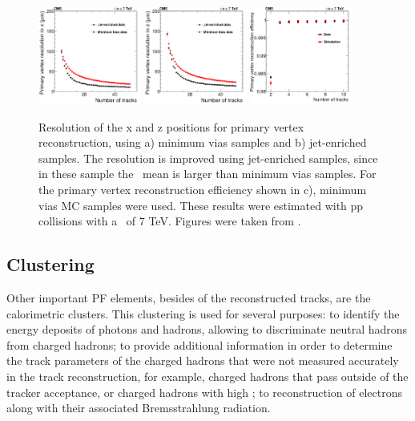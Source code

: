 \begin{figure}[ht]
  \begin{center}
    \includegraphics[width=0.3\textwidth]{figuras/Chapter3/RecoVertex_x_resolution.png}
    \includegraphics[width=0.3\textwidth]{figuras/Chapter3/RecoVertex_y_resolution.png}
    \includegraphics[width=0.3\textwidth]{figuras/Chapter3/Effciiency_vertex_resolution.png}
    \caption{Resolution of the x and z positions for primary vertex reconstruction, using a) minimum vias samples and b) jet-enriched samples. 
    The resolution is improved using jet-enriched samples, since in these sample the \pt~mean is larger than minimum vias samples.  
    For the primary vertex reconstruction efficiency shown in c), minimum vias MC samples were used. These results were estimated 
    with pp collisions with a \centermassenergy~of 7 TeV. Figures were taken from \cite{TrackAndVertexReconstruction}.}
    \label{fig:RecoVertex}
  \end{center}
\end{figure}


\subsection{Clustering}
\label{subsec:Clustering}

\noindent Other important PF elements, besides of the reconstructed tracks, are the calorimetric clusters. This
clustering is used for several purposes: to identify the 
energy deposits of photons and hadrons, allowing to discriminate neutral 
hadrons from charged hadrons; to provide additional information in order to 
determine the track parameters of the charged hadrons that were not measured 
accurately in the track reconstruction, for example, charged hadrons that pass outside 
of the tracker acceptance, or charged hadrons with high \pt; to reconstruction
of electrons along with their associated Bremsstrahlung radiation. \\

